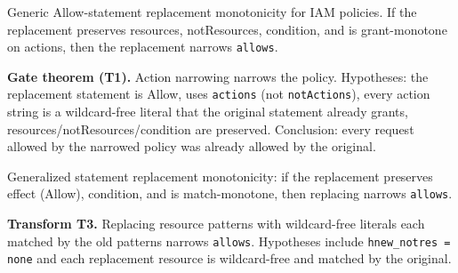 \begin{theorem}\label{thm:allows_replaceAllow_mono}
\leanok
Generic Allow-statement replacement monotonicity for IAM policies.
If the replacement preserves resources, notResources, condition, and is
grant-monotone on actions, then the replacement narrows \texttt{allows}.
\end{theorem}

\begin{theorem}\label{thm:narrowActions_narrows}
\leanok
\textbf{Gate theorem (T1).}
Action narrowing narrows the policy.  Hypotheses: the replacement
statement is Allow, uses \texttt{actions} (not \texttt{notActions}),
every action string is a wildcard-free literal that the original
statement already grants, resources/notResources/condition are
preserved.  Conclusion: every request allowed by the narrowed policy
was already allowed by the original.
\end{theorem}

\begin{theorem}\label{thm:allows_replace_stmt_mono}
\leanok
Generalized statement replacement monotonicity: if the replacement
preserves effect (Allow), condition, and is match-monotone, then
replacing narrows \texttt{allows}.
\end{theorem}

\begin{theorem}\label{thm:narrowResources_narrows}
\leanok
\textbf{Transform T3.}
Replacing resource patterns with wildcard-free literals each matched
by the old patterns narrows \texttt{allows}.  Hypotheses include
\texttt{hnew\_notres = none} and each replacement resource is
wildcard-free and matched by the original.
\end{theorem}
